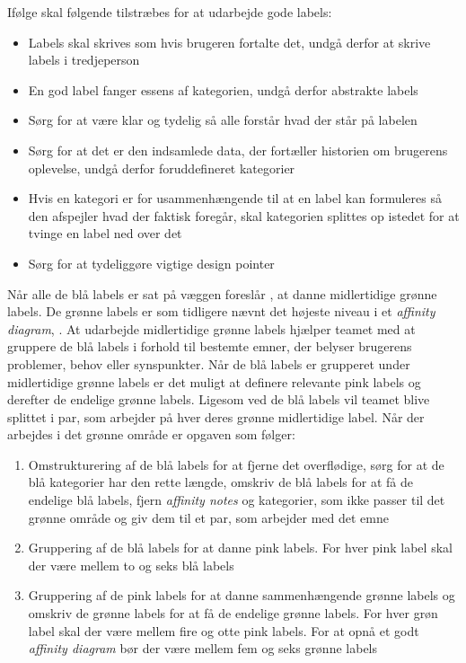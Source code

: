 Ifølge \textcite[s. 172]{Book:BuildingAnAffinity} skal følgende tilstræbes for at udarbejde gode labels: \blankline
%
\begin{itemize}
  \item Labels skal skrives som hvis brugeren fortalte det, undgå derfor at skrive labels i tredjeperson
  \item En god label fanger essens af kategorien, undgå derfor abstrakte labels
  \item Sørg for at være klar og tydelig så alle forstår hvad der står på labelen
  \item Sørg for at det er den indsamlede data, der fortæller historien om brugerens oplevelse, undgå derfor foruddefineret kategorier 
  \item Hvis en kategori er for usammenhængende til at en label kan formuleres så den afspejler hvad der faktisk foregår, skal kategorien splittes op istedet for at tvinge en label ned over det
  \item Sørg for at tydeliggøre vigtige design pointer \blankline  
\end{itemize}
%
Når alle de blå labels er sat på væggen foreslår \textcite[ss. 173-174]{Book:BuildingAnAffinity}, at danne midlertidige grønne labels. De grønne labels er som tidligere nævnt det højeste niveau i et \textit{affinity diagram}, \textcite[s. 160]{Book:BuildingAnAffinity}. At udarbejde midlertidige grønne labels hjælper teamet med at gruppere de blå labels i forhold til bestemte emner, der belyser brugerens problemer, behov eller synspunkter. Når de blå labels er grupperet under midlertidige grønne labels er det muligt at definere relevante pink labels og derefter de endelige grønne labels. Ligesom ved de blå labels vil teamet blive splittet i par, som arbejder på hver deres grønne midlertidige label. Når der arbejdes i det grønne område er opgaven som følger: \blankline
%
\begin{enumerate}
  \item Omstrukturering af de blå labels for at fjerne det overflødige, sørg for at de blå kategorier har den rette længde, omskriv de blå labels for at få de endelige blå labels, fjern \textit{affinity notes} og kategorier, som ikke passer til det grønne område og giv dem til et par, som arbejder med det emne
  \item Gruppering af de blå labels for at danne pink labels. For hver pink label skal der være mellem to og seks blå labels
  \item Gruppering af de pink labels for at danne sammenhængende grønne labels og omskriv de grønne labels for at få de endelige grønne labels. For hver grøn label skal der være mellem fire og otte pink labels. For at opnå et godt \textit{affinity diagram} bør der være mellem fem og seks grønne labels\blankline
\end{enumerate}
